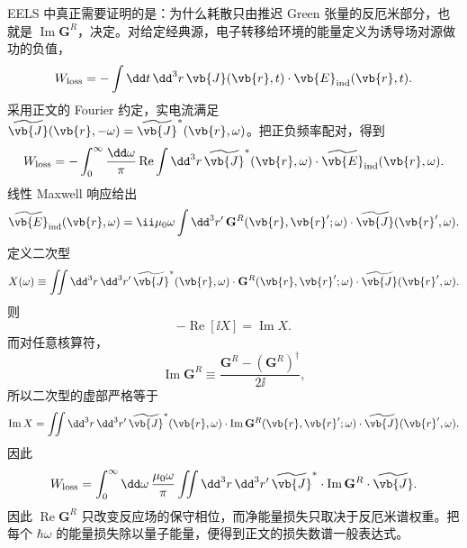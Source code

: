 \begin{derivation}[诱导场做功与电子能量损失谱]
EELS 中真正需要证明的是：为什么耗散只由推迟 Green 张量的反厄米部分，也就是 \(\operatorname{Im}\mathbf G^R\)，决定。对给定经典源，电子转移给环境的能量定义为诱导场对源做功的负值，
\begin{equation*}
W_{\rm loss}
=-\int\dd t\,\dd^3r\,
\vb{J}(\vb{r},t)\cdot\vb{E}_{\rm ind}(\vb{r},t).
\end{equation*}
采用正文的 Fourier 约定，实电流满足
\(\widetilde{\vb{J}}(\vb{r},-\omega)
=\widetilde{\vb{J}}^{*}(\vb{r},\omega)\)。把正负频率配对，得到
\begin{equation*}
W_{\rm loss}
=-\int_0^\infty\frac{\dd\omega}{\pi}
\operatorname{Re}
\int\dd^3r\,
\widetilde{\vb{J}}^{*}(\vb{r},\omega)
\cdot\widetilde{\vb{E}}_{\rm ind}(\vb{r},\omega).
\end{equation*}
线性 Maxwell 响应给出
\begin{equation*}
\widetilde{\vb{E}}_{\rm ind}(\vb{r},\omega)
=\ii\mu_0\omega
\int\dd^3r'\,
\mathbf G^R(\vb{r},\vb{r}';\omega)
\cdot\widetilde{\vb{J}}(\vb{r}',\omega).
\end{equation*}
定义二次型
\begin{equation*}
X(\omega)
\equiv
\iint\dd^3r\,\dd^3r'\,
\widetilde{\vb{J}}^{*}(\vb{r},\omega)
\cdot\mathbf G^R(\vb{r},\vb{r}';\omega)
\cdot\widetilde{\vb{J}}(\vb{r}',\omega).
\end{equation*}
则
\begin{equation*}
-\operatorname{Re}[\ii X]
=\operatorname{Im}X.
\end{equation*}
而对任意核算符，
\begin{equation*}
\operatorname{Im}\mathbf G^R
\equiv\frac{\mathbf G^R-(\mathbf G^R)^\dagger}{2\ii},
\end{equation*}
所以二次型的虚部严格等于
\begin{equation*}
\operatorname{Im}X
=\iint\dd^3r\,\dd^3r'\,
\widetilde{\vb{J}}^{*}(\vb{r},\omega)
\cdot\operatorname{Im}\mathbf G^R(\vb{r},\vb{r}';\omega)
\cdot\widetilde{\vb{J}}(\vb{r}',\omega).
\end{equation*}
因此
\begin{equation*}
W_{\rm loss}
=\int_0^\infty\dd\omega\,
\frac{\mu_0\omega}{\pi}
\iint\dd^3r\,\dd^3r'\,
\widetilde{\vb{J}}^{*}
\cdot\operatorname{Im}\mathbf G^R
\cdot\widetilde{\vb{J}}.
\end{equation*}
因此 \(\operatorname{Re}\mathbf G^R\) 只改变反应场的保守相位，而净能量损失只取决于反厄米谱权重。把每个 \(\hbar\omega\) 的能量损失除以量子能量，便得到正文的损失数谱一般表达式。


\end{derivation}
